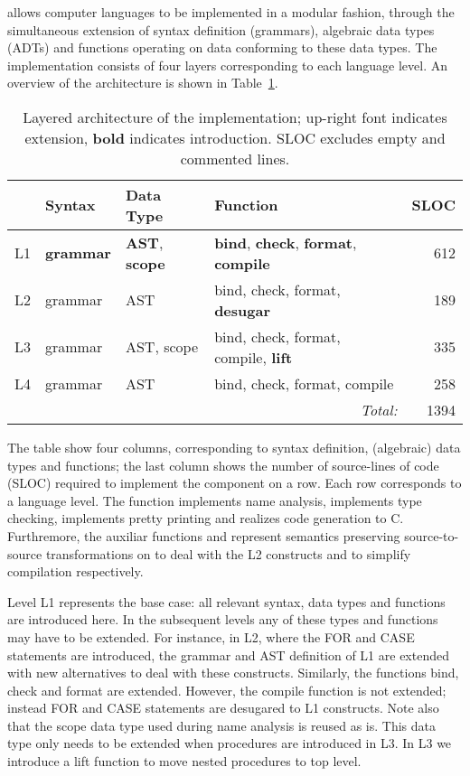 \noindent \Rascal allows computer languages to be implemented in a modular
fashion, through the simultaneous extension of syntax definition
(grammars), algebraic data types (ADTs) and functions operating on
data conforming to these data types. The \oberon implementation
consists of four layers corresponding to each language level. An
overview of the architecture is shown in Table~\ref{TBL:rascalArch}.

\begin{table}
\begin{center}\small
\begin{tabular}{|l||l|l|l|r|}\hline
   &  Syntax & Data Type & Function & SLOC \\\hline\hline
L1 &  \textbf{grammar} & \textbf{AST}, \textbf{scope} & 
\textbf{bind}, \textbf{check}, \textbf{format}, \textbf{compile} & 612 \\\hline 
L2 & grammar & AST & bind, check, format, \textbf{desugar} & 189 \\\hline
L3 & grammar & AST, scope & bind, check, format, compile, \textbf{lift} & 335\\\hline
L4 & grammar & AST & bind, check, format, compile & 258 \\\hline\hline
\multicolumn{4}{|r|}{\textit{Total:}} & 1394 \\\hline
\end{tabular}
\end{center}
\caption{Layered architecture of the \Rascal \oberon implementation;
  up-right font indicates extension, \textbf{bold} indicates introduction. SLOC excludes empty and commented lines.\label{TBL:rascalArch}}
\end{table}

The table show four columns, corresponding to syntax definition,
(algebraic) data types and functions; the last column shows the number of source-lines of code (SLOC) required to implement the component on a row.  Each row corresponds to a
language level. The function  implements name analysis,  implements type checking,  implements pretty printing and  realizes code generation to C. Furthremore, the auxiliar functions  and  represent semantics preserving source-to-source transformations on \oberon to deal with the L2 constructs and to simplify compilation respectively. 

Level L1 represents the base case: all relevant
syntax, data types and functions are introduced here. In the
subsequent levels any of these types and functions may have to be
extended. For instance, in L2, where the FOR and CASE statements are
introduced, the grammar and AST definition of L1 are extended with new
alternatives to deal with these constructs. Similarly, the functions
bind, check and format are extended. However, the compile function is
not extended; instead FOR and CASE statements are desugared to L1
constructs. Note also that the scope data type used during name
analysis is reused as is. This data type only needs to be extended
when procedures are introduced in L3. In L3 we introduce a lift
function to move nested procedures to top level.


